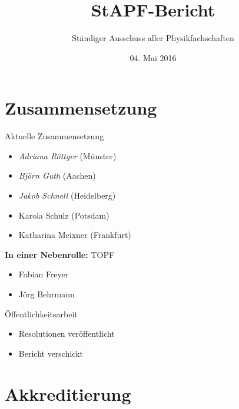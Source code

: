 \documentclass[compress,]{beamer}
\title[StAPf-Bericht]{StAPF-Bericht}
\author{Ständiger Ausschuss aller Physikfachschaften}
\institute[Zusammenkunft aller Physikfachschaften]
\date{04. Mai 2016}
\begin{document}
\begin{frame}[plain]{}
  \titlepage
\end{frame}

\section{Zusammensetzung}

\begin{frame}{Aktuelle Zusammensetzung}
	\begin{itemize}
		\item \emph{Adriana Röttger} (Münster)
		\item \emph{Björn Guth} (Aachen)
		\item \emph{Jakob Schnell} (Heidelberg)
		\item Karola Schulz (Potsdam)
		\item Katharina Meixner (Frankfurt)
	\end{itemize}
	\textbf{In einer Nebenrolle:} TOPF
	\begin{itemize}
		\item Fabian Freyer
		\item Jörg Behrmann
	\end{itemize}
\end{frame}

\begin{frame}{Öffentlichkeitsarbeit}
	\begin{itemize}
		\item Resolutionen veröffentlicht
		\item Bericht verschickt
	\end{itemize}
\end{frame}

\section{Akkreditierung}
\end{document}
